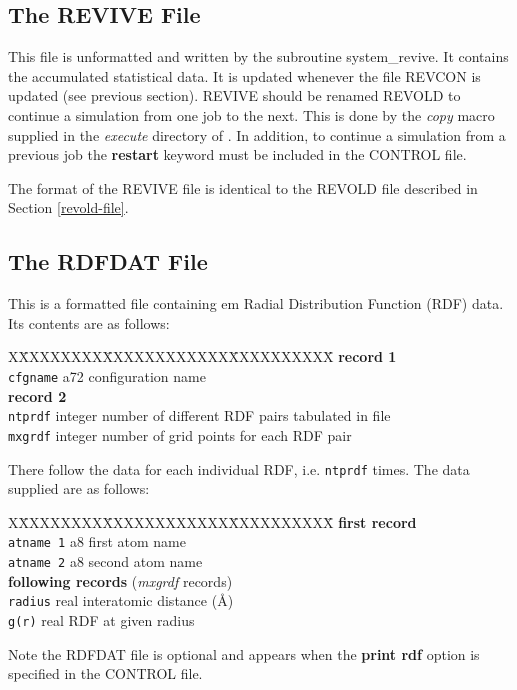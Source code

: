 \subsection{The REVIVE File}
\label{revive-file}

This file is unformatted and written by the subroutine {\sc
system\_revive}.  It contains the accumulated statistical data. It
is updated whenever the file REVCON is updated (see previous
section).  REVIVE should be renamed REVOLD to continue a
simulation from one job to the next.  This is done by the {\sl
copy} macro supplied in the {\em execute} directory of \D.  In
addition, to continue a simulation from a previous job the {\bf
restart} keyword must be included in the CONTROL file.

The format of the REVIVE file is identical to the REVOLD file
described in Section \ref{revold-file}.

\subsection{The RDFDAT File}
\label{rdf-file}

This is a formatted file containing {em Radial Distribution
Function} (RDF) data.  Its contents are as follows:
\begin{tabbing}
X\=XXXXXXXX\=XXXXXXXXXXXX\=XXXXXXXXXX\=\kill
{\bf record 1} \\
\> {\tt cfgname} \> a72     \> configuration name \\
{\bf record 2} \\
\> {\tt ntprdf}  \> integer \> number of different RDF pairs tabulated in file \\
\> {\tt mxgrdf}  \> integer \> number of grid points for each RDF pair\\
\end{tabbing}
There follow the data for each individual RDF, i.e. {\tt ntprdf}
times.  The data supplied are as follows:
\begin{tabbing}
X\=XXXXXXXX\=XXXXXXXXXXXX\=XXXXXXXXXX\=\kill
{\bf first record} \\
\> {\tt atname 1} \> a8   \> first atom name \\
\> {\tt atname 2} \> a8   \> second atom name \\
{\bf following records} ({\em mxgrdf} records) \\
\> {\tt radius}   \> real \> interatomic distance (\AA) \\
\> {\tt g(r)}     \> real \> RDF at given radius \\
\end{tabbing}
Note the RDFDAT file is optional and appears when the {\bf print
rdf} option is specified in the CONTROL file.

